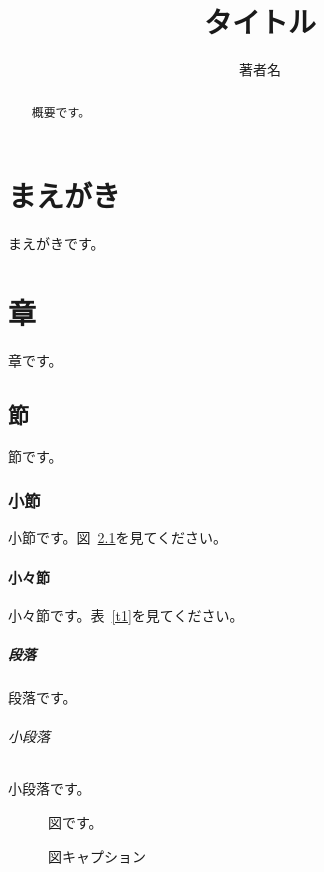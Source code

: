 \documentclass[a5paper]{jsbook}
\title{タイトル}
\author{著者名}
\begin{document}
\frontmatter
\maketitle

\chapter{まえがき}

まえがきです。

\tableofcontents
\mainmatter


\chapter{章}

\begin{abstract}
概要です。
\end{abstract}

章です。

\section{節}

節です\cite{1}。

\subsection{小節}

小節です。図~\ref{f1}を見てください。

\subsubsection{小々節}

小々節です。表~\ref{t1}を見てください。

\paragraph{段落}

段落です。

\subparagraph{小段落}

小段落です。

\begin{figure}[tb]
\begin{center}
図です。
\end{center}
\caption{図キャプション}
\label{f1}
\end{figure}
\end{document}
